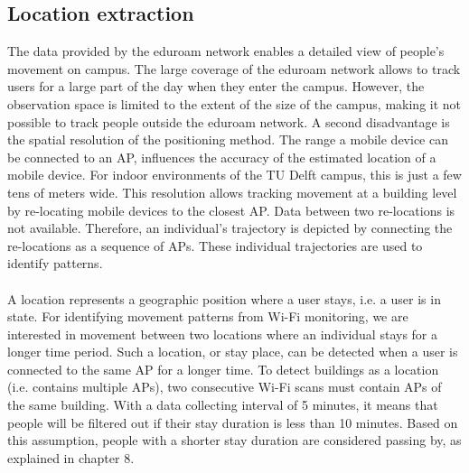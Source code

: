 \subsection{Location extraction}
The data provided by the eduroam network enables a detailed view of people’s movement on campus. The large coverage of the eduroam network allows to track users for a large part of the day when they enter the campus. However, the observation space is limited to the extent of the size of the campus, making it not possible to track people outside the eduroam network. A second disadvantage is the spatial resolution of the positioning method. The range a mobile device can be connected to an AP,  influences the accuracy of the estimated location of a mobile device. For indoor environments of the TU Delft campus, this is just a few tens of meters wide. This resolution allows tracking movement at a building level by re-locating mobile devices to the closest AP. Data between two re-locations is not available. Therefore, an individual’s trajectory is depicted by connecting the re-locations as a sequence of APs. These individual trajectories are used to identify patterns. \\\\
A location represents a geographic position where a user stays, i.e. a user is in state. For identifying movement patterns from Wi-Fi monitoring, we are interested in movement between two locations where an individual stays for a longer time period. Such a location, or stay place, can be detected when a user is connected to the same AP for a longer time. To detect  buildings as a location (i.e. contains multiple APs), two consecutive Wi-Fi scans must contain  APs of the same building. With a data collecting interval of 5 minutes, it means that people will be filtered out if their stay duration is less than 10 minutes. Based on this assumption, people with a shorter stay duration are considered passing by, as explained in chapter 8.

